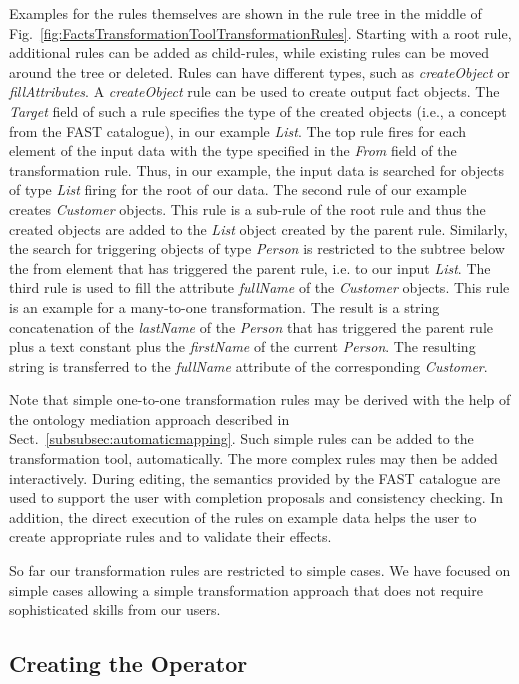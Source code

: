 Examples for the rules themselves are shown in the rule tree in the middle of Fig.~\ref{fig:FactsTransformationToolTransformationRules}. Starting with a root rule, additional rules can be added as child-rules, while existing rules can be moved around the tree or deleted. Rules can have different types, such as \emph{createObject} or \emph{fillAttributes}. A \textit{createObject} rule can be used to create output fact objects. The \textit{Target} field of such a rule specifies the type of the created objects (i.e., a concept from the FAST catalogue), in our example \textit{List}. The top rule fires for each element of the input data with the type specified in the \textit{From} field of the transformation rule. Thus, in our example, the input data is searched for objects of type \textit{List} firing for the root of our data. The second rule of our example creates \textit{Customer} objects. This rule is a sub-rule of the root rule and thus the created objects are added to the \textit{List} object created by the parent rule. Similarly, the search for triggering objects of type \textit{Person} is restricted to the subtree below the from element that has triggered the parent rule, i.e. to our input \textit{List}. The third rule is used to fill the attribute \textit{fullName} of the \textit{Customer} objects. This rule is an example for a many-to-one transformation. The result is a string concatenation of the \textit{lastName} of the \textit{Person} that has triggered the parent rule plus a text constant plus the \textit{firstName} of the current \textit{Person}. The resulting string is transferred to the \textit{fullName} attribute of the corresponding \textit{Customer}. 

Note that simple one-to-one transformation rules may be derived with the help of the ontology mediation approach described in Sect.~\ref{subsubsec:automaticmapping}. Such simple rules can be added to the transformation tool, automatically. The more complex rules may then be added interactively. During editing, the semantics provided by the FAST catalogue are used to support the user with completion proposals and consistency checking. In addition, the direct execution of the rules on example data helps the user to create appropriate rules and to validate their effects. 

So far our transformation rules are restricted to simple cases. We have focused on simple cases allowing a simple transformation approach that does not require sophisticated skills from our users. 


\subsection{Creating the Operator}
\label{sec:creating_the_operator}

